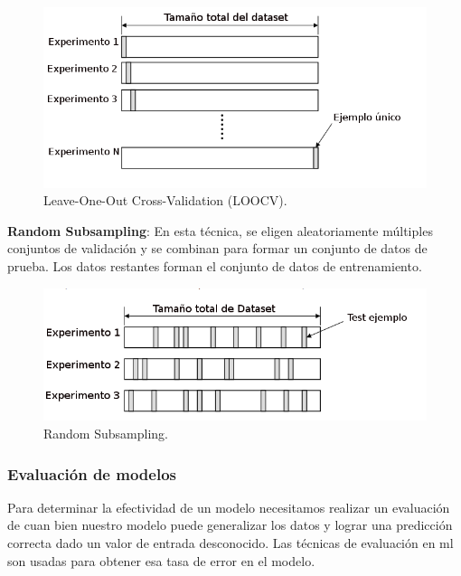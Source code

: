 \begin{figure}[H]
 \centering
  \includegraphics[scale=0.4,keepaspectratio=true,clip=true]{imagenes/MarcoTeorico/cross-validation-LOOCV.png}
  \caption{Leave-One-Out Cross-Validation (LOOCV).}%
	\label{Fig: crossvalidation-LOOCV}
\end{figure}

\par \textbf{Random Subsampling}: En esta técnica, se eligen aleatoriamente múltiples conjuntos de validación y se combinan para formar un conjunto de datos de prueba. Los datos restantes forman el conjunto de datos de entrenamiento.

\begin{figure}[H]
 \centering
  \includegraphics[scale=0.5,keepaspectratio=true,clip=true]{imagenes/MarcoTeorico/cross-validation-random.png}
  \caption{Random Subsampling.}%
	\label{Fig: random-Subsampling}
\end{figure}


\subsubsection{Evaluación de modelos}\label{sub:evaluación-modelo}
Para determinar la efectividad de un modelo necesitamos realizar un evaluación de cuan bien nuestro modelo puede generalizar los datos y lograr una predicción correcta dado un valor de entrada desconocido. Las técnicas de evaluación en \ac{ml} son usadas para obtener esa tasa de error en el modelo. 

